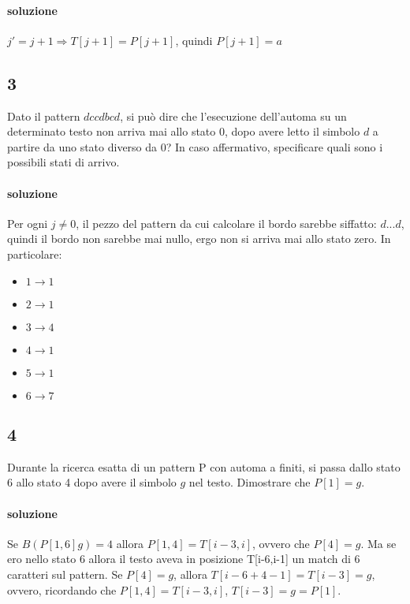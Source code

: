 \paragraph{soluzione} $j' = j + 1 \Rightarrow T[j+1] = P[j+1]$, quindi $P[j+1] = a$

\subsection{3}

Dato il pattern $dccdbcd$, si può dire che l’esecuzione dell’automa su un determinato testo non arriva mai allo stato 0, dopo avere letto il simbolo $d$ a partire da uno stato diverso da 0? In caso affermativo, specificare quali sono i possibili stati di arrivo.

\paragraph{soluzione} Per ogni $j \neq 0$, il pezzo del pattern da cui calcolare il bordo sarebbe siffatto: $d...d$, quindi il bordo non sarebbe mai nullo, ergo non si arriva mai allo stato zero. In particolare:

\begin{itemize}
    \item $1 \rightarrow 1$
    \item $2 \rightarrow 1$
    \item $3 \rightarrow 4$
    \item $4 \rightarrow 1$
    \item $5 \rightarrow 1$
    \item $6 \rightarrow 7$
\end{itemize}

\subsection{4}

Durante la ricerca esatta di un pattern P con automa a finiti, si passa dallo stato 6 allo stato 4 dopo avere il simbolo $g$ nel testo. Dimostrare che $P[1] = g$.

\paragraph{soluzione} Se $B(P[1,6]g) = 4$ allora $P[1,4] = T[i-3,i]$, ovvero che $P[4] = g$. Ma se ero nello stato 6 allora il testo aveva in posizione T[i-6,i-1] un match di 6 caratteri sul pattern. Se $P[4] = g$, allora $T[i-6+4-1] = T[i-3] = g$, ovvero, ricordando che $P[1,4] = T[i-3,i]$, $T[i-3] = g = P[1]$.

